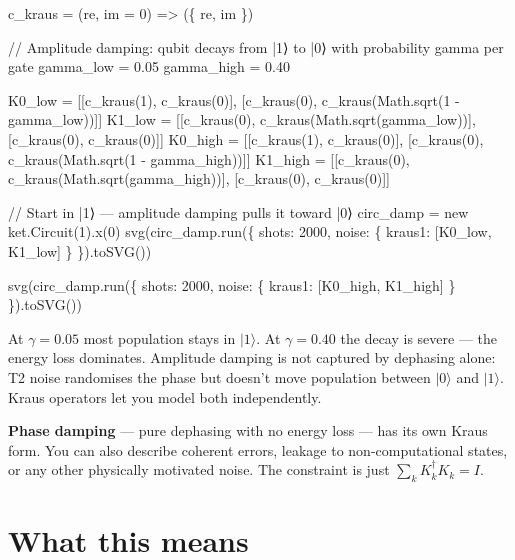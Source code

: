 \documentclass[
  11pt,
  letterpaper,
  oneside]{scrbook}
\newenvironment{Shaded}{\begin{snugshade}}{\end{snugshade}}
\newcommand{\NormalTok}[1]{\textcolor[rgb]{0.00,0.23,0.31}{#1}}
\begin{document}
\begin{Shaded}
\begin{Highlighting}[]
\NormalTok{c\_kraus = (re, im = 0) =\textgreater{} (\{ re, im \})}

\NormalTok{// Amplitude damping: qubit decays from |1⟩ to |0⟩ with probability gamma per gate}
\NormalTok{gamma\_low  = 0.05}
\NormalTok{gamma\_high = 0.40}

\NormalTok{K0\_low  = [[c\_kraus(1), c\_kraus(0)], [c\_kraus(0), c\_kraus(Math.sqrt(1 {-} gamma\_low))]]}
\NormalTok{K1\_low  = [[c\_kraus(0), c\_kraus(Math.sqrt(gamma\_low))],  [c\_kraus(0), c\_kraus(0)]]}
\NormalTok{K0\_high = [[c\_kraus(1), c\_kraus(0)], [c\_kraus(0), c\_kraus(Math.sqrt(1 {-} gamma\_high))]]}
\NormalTok{K1\_high = [[c\_kraus(0), c\_kraus(Math.sqrt(gamma\_high))], [c\_kraus(0), c\_kraus(0)]]}
\end{Highlighting}
\end{Shaded}

\begin{Shaded}
\begin{Highlighting}[]
\NormalTok{// Start in |1⟩ — amplitude damping pulls it toward |0⟩}
\NormalTok{circ\_damp = new ket.Circuit(1).x(0)}
\NormalTok{svg(circ\_damp.run(\{ shots: 2000, noise: \{ kraus1: [K0\_low,  K1\_low]  \} \}).toSVG())}
\end{Highlighting}
\end{Shaded}

\begin{Shaded}
\begin{Highlighting}[]
\NormalTok{svg(circ\_damp.run(\{ shots: 2000, noise: \{ kraus1: [K0\_high, K1\_high] \} \}).toSVG())}
\end{Highlighting}
\end{Shaded}

At \(\gamma = 0.05\) most population stays in \(|1\rangle\). At
\(\gamma = 0.40\) the decay is severe --- the energy loss dominates.
Amplitude damping is not captured by dephasing alone: T2 noise
randomises the phase but doesn't move population between \(|0\rangle\)
and \(|1\rangle\). Kraus operators let you model both independently.

\textbf{Phase damping} --- pure dephasing with no energy loss --- has
its own Kraus form. You can also describe coherent errors, leakage to
non-computational states, or any other physically motivated noise. The
constraint is just \(\sum_k K_k^\dagger K_k = I\).

\section{What this means}\label{what-this-means}
\end{document}

